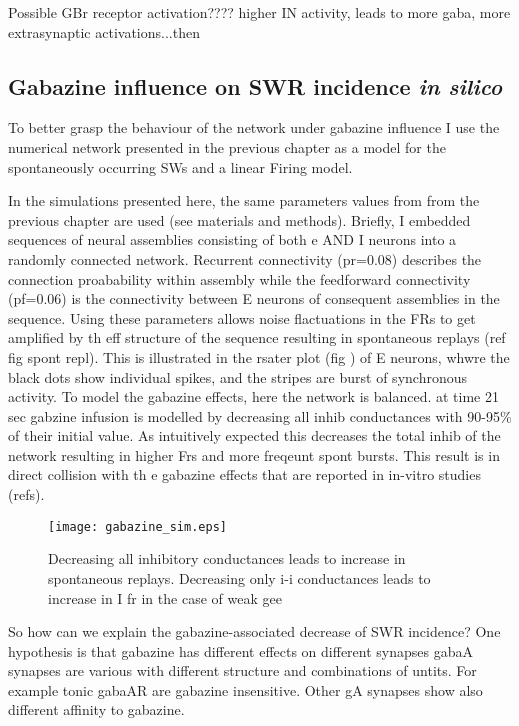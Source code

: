     Possible GBr receptor activation???? higher IN activity, leads to more
    gaba, more extrasynaptic activations...then 

  \subsection{Gabazine influence on SWR incidence {\textit {in silico} }}

    To better grasp the behaviour of the network under gabazine influence I use
    the numerical network presented in the previous chapter as a model for the
    spontaneously occurring SWs and a linear Firing model.

    In the simulations presented here, the same parameters values from from the
    previous chapter are used (see materials and methods).  Briefly, I embedded
    sequences of neural assemblies consisting of both e AND I neurons into a
    randomly connected network. Recurrent connectivity (pr=0.08) describes the
    connection proabability within assembly while the feedforward connectivity
    (pf=0.06) is the connectivity between E neurons of consequent assemblies in
    the sequence. Using these parameters allows noise flactuations in the FRs
    to get amplified by th eff structure of the sequence resulting in
    spontaneous replays (ref fig spont repl).
    This is illustrated in the rsater plot (fig ) of E neurons, whwre the black
    dots show individual spikes, and the stripes are burst of synchronous
    activity. To model the gabazine effects, here the network is balanced. at
    time 21 sec gabzine infusion is modelled by decreasing all inhib
    conductances with 90-95\% of their initial value. As intuitively expected
    this decreases the total inhib of the network resulting in higher Frs and
    more freqeunt spont bursts. This result is in direct collision with th e
    gabazine effects that are reported in in-vitro studies (refs).

    \begin{figure}
      \texttt{[image: gabazine\_sim.eps]}
      \caption{Decreasing all inhibitory conductances leads to increase in
                spontaneous replays.
              Decreasing only i-i conductances leads to increase in I fr in
              the case of weak gee}
      \label{fig:gabazine_sim}
    \end{figure}

    So how can we explain the gabazine-associated decrease of SWR incidence?
    One hypothesis is that gabazine has different effects on different synapses
    gabaA synapses are various with different structure and combinations of
    untits. For example tonic gabaAR are gabazine insensitive. Other gA
    synapses show also different affinity to gabazine.
    
